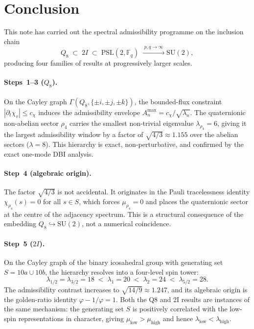 \section{Conclusion}
  \label{sec:conclusion}

  This note has carried out the spectral admissibility programme on the
  inclusion chain
  \begin{equation}
    Q_8 \;\subset\; 2I \;\subset\; \mathrm{PSL}(2,\mathbb{F}_q)
    \;\xrightarrow{\;p,q\to\infty\;}
    \mathrm{SU}(2),
    \label{eq:chain-conclusion}
  \end{equation}
  producing four families of results at progressively larger scales.

  \paragraph{Steps~1--3 ($Q_8$).}
    On the Cayley graph $\Gamma(Q_8, \{\pm i, \pm j, \pm k\})$, the
    bounded-flux constraint $|\partial_t\chi_v| \leq c_\chi$ induces the
    admissibility envelope $A^{\max}_n = c_\chi/\sqrt{\lambda_n}$.
    The quaternionic non-abelian sector $\rho_4$ carries the smallest
    non-trivial eigenvalue $\lambda_{\rho_4} = 6$, giving it the largest
    admissibility window by a factor of $\sqrt{4/3} \approx 1.155$ over the
    abelian sectors ($\lambda = 8$).
    This hierarchy is exact, non-perturbative, and confirmed by the exact
    one-mode DBI analysis.

  \paragraph{Step~4 (algebraic origin).}
    The factor $\sqrt{4/3}$ is not accidental.
    It originates in the Pauli tracelessness identity
    $\chi_{\rho_4}(s) = 0$ for all $s \in S$, which forces $\mu_{\rho_4} = 0$
    and places the quaternionic sector at the centre of the adjacency spectrum.
    This is a structural consequence of the embedding $Q_8 \hookrightarrow
\mathrm{SU}(2)$, not a numerical coincidence.

  \paragraph{Step~5 ($2I$).}
    On the Cayley graph of the binary icosahedral group with generating set
    $S = 10a \cup 10b$, the hierarchy resolves into a four-level spin tower:
    \begin{equation}
      \lambda_{1/2} = \lambda_{3/2} = 18
      \;<\; \lambda_1 = 20
      \;<\; \lambda_2 = 24
      \;<\; \lambda_{5/2} = 28.
      \label{eq:2I-ordering-concl}
    \end{equation}
    The admissibility contrast increases to $\sqrt{14/9} \approx 1.247$, and
    its algebraic origin is the golden-ratio identity
    $\varphi - 1/\varphi = 1$.
    Both the Q8 and 2I results are instances of the same mechanism:
    the generating set $S$ is positively correlated with the low-spin
    representations in character, giving $\mu_{\text{low}} > \mu_{\text{high}}$
    and hence $\lambda_{\text{low}} < \lambda_{\text{high}}$.

